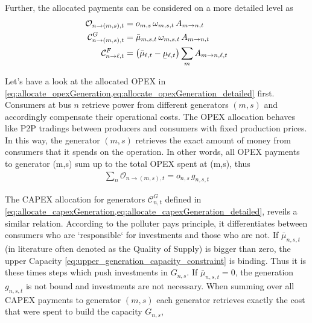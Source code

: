 \documentclass[11pt,twocolumn]{article}
\newcommand{\ubar}[1]{\underaccent{\bar}{#1}}
\newcommand{\generation}[1][n]{g_{#1,s,t}}
\newcommand{\generationshare}[1][n]{\omega_{#1,s,t}}
\newcommand{\capacityGeneration}{G_{n,s}}
\newcommand{\opexGeneration}[1][n]{o_{#1,s}}
\newcommand{\muuppergeneration}[1][n]{\bar{\mu}_{#1,s,t}}
\newcommand{\mulowerflow}{\ubar{\mu}_{\ell,t}}
\newcommand{\muupperflow}{\bar{\mu}_{\ell,t}}
\newcommand{\allocatePeer}[1][m \rightarrow n]{A_{#1,t}}
\newcommand{\allocateTransaction}[1][m \rightarrow n]{A_{#1,\ell,t}}
\newcommand{\allocateCapexGeneration}[1][n]{\mathcal{C}^{G}_{#1,t}}
\newcommand{\allocateCapexFlow}[1][n]{\mathcal{C}^{F}_{#1,t}}
\newcommand{\allocateOpex}[1][n]{\mathcal{O}_{#1,t}}
\begin{document}
Further, the allocated payments can be considered on a more detailed level as
\begin{align}
\allocateOpex[n \rightarrow (m,s)] &= 
\opexGeneration[m] \, \generationshare[m] \, \allocatePeer 
\label{eq:allocate_opexGeneration_detailed}\\
\allocateCapexGeneration[n \rightarrow (m,s)] &= 
\muuppergeneration[m] \, \generationshare[m] \, \allocatePeer
\label{eq:allocate_capexGeneration_detailed} \\
\allocateCapexFlow[n \rightarrow \ell] &=  
\left( \muupperflow - \mulowerflow\right) \sum_{m} \allocateTransaction  
\label{eq:allocate_capexFlow_detailed}
\end{align}
% 

Let's have a look at the allocated OPEX in \cref{eq:allocate_opexGeneration,eq:allocate_opexGeneration_detailed} first. Consumers at bus $n$ retrieve power from different generators $(m,s)$ and accordingly compensate their operational costs. The OPEX allocation behaves like P2P tradings between producers and consumers with fixed production prices. In this way, the generator $(m,s)$ retrieves the exact amount of money from consumers that it spends on the operation. In other words, all OPEX payments to generator (m,s) sum up to the total OPEX spent at (m,s), thus 
\begin{align}
\sum_{n} \allocateOpex[n \rightarrow (m,s)] = \opexGeneration \, \generation
\label{eq:no_profit_opex}
\end{align}


The CAPEX allocation for generators $\allocateCapexGeneration$ defined in \cref{eq:allocate_capexGeneration,eq:allocate_capexGeneration_detailed}, reveils a similar relation. According to the polluter pays principle, it differentiates between consumers who are `responsible` for investments and those who are not. If $\muuppergeneration$ (in literature often denoted as the Quality of Supply) is bigger than zero, the upper Capacity \cref{eq:upper_generation_capacity_constraint} is binding. Thus it is these times steps which push investments in $\capacityGeneration$. If $\muuppergeneration = 0$, the generation $\generation$ is not bound and investments are not necessary. 
When summing over all CAPEX payments to generator $(m,s)$ each generator retrieves exactly the cost that were spent to build the capacity $\capacityGeneration$,
\end{document}
